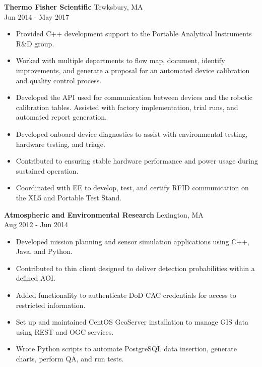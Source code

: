 \documentclass[10pt]{article}
\newcommand{\verticalspace}{\vspace{2.0mm}}
\begin{document}
\verticalspace

{\bf Thermo Fisher Scientific} \hfill Tewksbury, MA \\
 \hfill Jun 2014 - May 2017
\begin{itemize}
\item Provided C++ development support to the Portable Analytical Instruments R\&D group.

\item Worked with multiple departments to flow map, document, identify improvements, and generate a proposal for an automated device calibration and quality control process.
\item Developed the API used for communication between devices and the robotic calibration tables.  Assisted with factory implementation, trial runs, and automated report generation.
\item Developed onboard device diagnostics to assist with environmental testing, hardware testing, and triage.
\item Contributed to ensuring stable hardware performance and power usage during sustained operation.
\item Coordinated with EE to develop, test, and certify RFID communication on the XL5 and Portable Test Stand. 
\end{itemize}

\verticalspace

{\bf Atmospheric and Environmental Research} \hfill Lexington, MA \\
 \hfill Aug 2012 - Jun 2014
\begin{itemize}
\item Developed mission planning and sensor simulation applications using C++, Java, and Python.
\item Contributed to thin client designed to deliver detection probabilities within a defined AOI.
\item Added functionality to authenticate DoD CAC credentials for access to restricted information.
\item Set up and maintained CentOS GeoServer installation to manage GIS data using REST and OGC services.
\item Wrote Python scripts to automate PostgreSQL data insertion, generate charts, perform QA, and run tests.
\end{itemize}

\verticalspace
\end{document}
